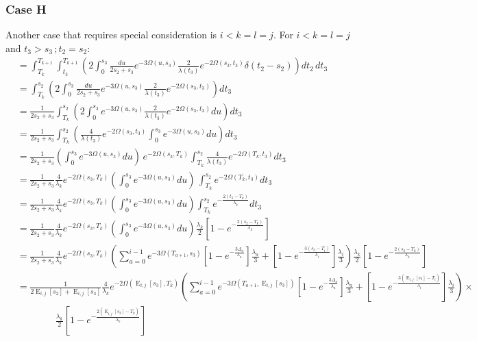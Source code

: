\documentclass{article}
\DeclareMathOperator{\E}{E}
\begin{document}
\subsubsection{Case H}
Another case that requires special consideration is $i<k=l=j$.
For $i<k=l=j$ and $t_3>s_3\,;t_2=s_2$:
\begin{align*}
    &=\int_{T_k}^{T_{k+1}}\int_{t_3}^{T_{k+1}}\left(2\int_0^{s_3}\frac{du}{2s_2+s_3}e^{-3\Omega(u,s_3)}\frac{2}{\lambda(t_3)}e^{-2\Omega(s_3,t_3)}\delta(t_2-s_2)\right)dt_2\,dt_3\\
    &=\int_{T_k}^{s_2}\left(2\int_0^{s_3}\frac{du}{2s_2+s_3}e^{-3\Omega(u,s_3)}\frac{2}{\lambda(t_3)}e^{-2\Omega(s_3,t_3)}\right)dt_3\\
    &=\frac{1}{2s_2+s_3}\int_{T_k}^{s_2}\left(2\int_0^{s_3}e^{-3\Omega(u,s_3)}\frac{2}{\lambda(t_3)}e^{-2\Omega(s_3,t_3)}du\right)dt_3\\
    &=\frac{1}{2s_2+s_3}\int_{T_k}^{s_2}\left(\frac{4}{\lambda(t_3)}e^{-2\Omega(s_3,t_3)}\int_0^{s_3}e^{-3\Omega(u,s_3)}du\right)dt_3\\
    &=\frac{1}{2s_2+s_3}\left(\int_0^{s_3}e^{-3\Omega(u,s_3)}du\right)\,e^{-2\Omega(s_3,T_k)}\int_{T_k}^{s_2}\frac{4}{\lambda(t_3)}e^{-2\Omega(T_k,t_3)}dt_3\\
    &=\frac{1}{2s_2+s_3}\frac{4}{\lambda_k}e^{-2\Omega(s_3,T_k)}\left(\int_0^{s_3}e^{-3\Omega(u,s_3)}du\right)\,\int_{T_k}^{s_2}e^{-2\Omega(T_k,t_3)}dt_3\\
    &=\frac{1}{2s_2+s_3}\frac{4}{\lambda_k}e^{-2\Omega(s_3,T_k)}\left(\int_0^{s_3}e^{-3\Omega(u,s_3)}du\right)
    \int_{T_k}^{s_2}e^{-\frac{2(t_3-T_k)}{\lambda_k}}dt_3\\
    &=\frac{1}{2s_2+s_3}\frac{4}{\lambda_k}e^{-2\Omega(s_3,T_k)}\left(\int_0^{s_3}e^{-3\Omega(u,s_3)}du\right)
    \frac{\lambda_k}{2}\left[1-e^{-\frac{2(s_2-T_k)}{\lambda_k}}\right]\\
    &=\frac{1}{2s_2+s_3}\frac{4}{\lambda_k}e^{-2\Omega(s_3,T_k)}\left(
    \sum_{a=0}^{i-1} e^{-3\Omega(T_{a+1},s_3)}
    \left[1-e^{-\frac{3 \Delta_a}{\lambda_a}}\right]\frac{\lambda_a}{3}+
    \left[1-e^{-\frac{3 \left(s_3-T_{i}\right)}{\lambda_{i}}}\right]\frac{\lambda_{i}}{3}
    \right)
    \frac{\lambda_k}{2}\left[1-e^{-\frac{2(s_2-T_k)}{\lambda_k}}\right]\\
    &=\frac{1}{2\E_{i,j}[s_2]+\E_{i,j}[s_3]}\frac{4}{\lambda_k}e^{-2\Omega(\E_{i,j}[s_3],T_k)}\left(
    \sum_{a=0}^{i-1} e^{-3\Omega(T_{a+1},\E_{i,j}[s_3])}
    \left[1-e^{-\frac{3 \Delta_a}{\lambda_a}}\right]\frac{\lambda_a}{3}+
    \left[1-e^{-\frac{3 \left(\E_{i,j}[s_3]-T_{i}\right)}{\lambda_{i}}}\right]\frac{\lambda_{i}}{3}
    \right) \times \\
    &\qquad\qquad\frac{\lambda_k}{2}\left[1-e^{-\frac{2(\E_{i,j}[s_2]-T_k)}{\lambda_k}}\right]\\
\end{align*}
\end{document}
